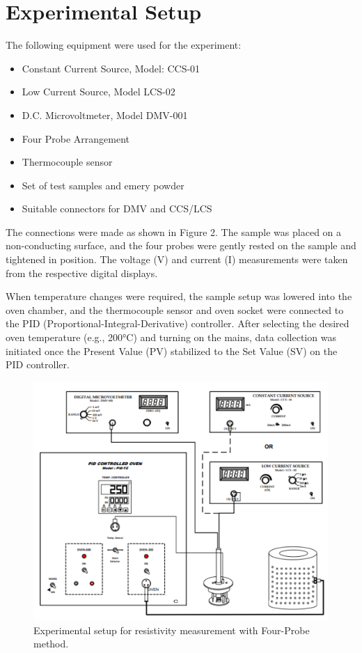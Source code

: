 \section{Experimental Setup}

	The following equipment were used for the experiment:

	\begin{itemize}
	\item Constant Current Source, Model: CCS-01
	\item Low Current Source, Model LCS-02
	\item D.C. Microvoltmeter, Model DMV-001
	\item Four Probe Arrangement
	\item Thermocouple sensor
	\item Set of test samples and emery powder
	\item Suitable connectors for DMV and CCS/LCS
	\end{itemize}

	The connections were made as shown in Figure 2. The sample was placed on a non-conducting surface, and the four probes were gently rested on the sample and tightened in position. The voltage (V) and current (I) measurements were taken from the respective digital displays.

	When temperature changes were required, the sample setup was lowered into the oven chamber, and the thermocouple sensor and oven socket were connected to the PID (Proportional-Integral-Derivative) controller. After selecting the desired oven temperature (e.g., 200°C) and turning on the mains, data collection was initiated once the Present Value (PV) stabilized to the Set Value (SV) on the PID controller.

	\begin{figure}[h]
		\centering
		\includegraphics[width=0.8\columnwidth]{images/setup.png}
		\caption{Experimental setup for resistivity measurement with Four-Probe method.}
		\label{fig:2}
	\end{figure}
